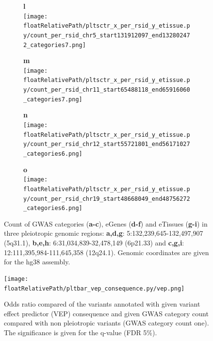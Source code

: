 \begin{figure}[!tbp]
%
\begin{subfigure}[]{.19\textwidth}
\textbf{l}
\\
\texttt{[image: \\floatRelativePath/pltsctr\_x\_per\_rsid\_y\_etissue.py/count\_per\_rsid\_chr5\_start131912097\_end132802472\_categories7.png]}
\end{subfigure}
%
\begin{subfigure}[]{.19\textwidth}
\textbf{m}
\\
\texttt{[image: \\floatRelativePath/pltsctr\_x\_per\_rsid\_y\_etissue.py/count\_per\_rsid\_chr11\_start65488118\_end65916060\_categories7.png]}
\end{subfigure}
%
\begin{subfigure}[]{.19\textwidth}
\textbf{n}
\\
\texttt{[image: \\floatRelativePath/pltsctr\_x\_per\_rsid\_y\_etissue.py/count\_per\_rsid\_chr12\_start55721801\_end56171027\_categories6.png]}
\end{subfigure}
%
\begin{subfigure}[]{.19\textwidth}
\textbf{o}
\\
\texttt{[image: \\floatRelativePath/pltsctr\_x\_per\_rsid\_y\_etissue.py/count\_per\_rsid\_chr19\_start48668049\_end48756272\_categories6.png]}
\end{subfigure}

\caption{Count of GWAS categories (\textbf{a-c}), eGenes (\textbf{d-f}) and eTissues (\textbf{g-i}) in three pleiotropic genomic regions: \textbf{a,d,g}: 5:132,239,645-132,497,907 (5q31.1), \textbf{b,e,h}: 6:31,034,839-32,478,149 (6p21.33) and \textbf{c,g,i}: 12:111,395,984-111,645,358 (12q24.1). Genomic coordinates are given for the hg38 assembly.} \label{fig:region_gwas_egenes_tissues}
%
\end{figure}
%
%
\begin{figure}[!tbp]
\centering
%
\texttt{[image: \\floatRelativePath/pltbar\_vep\_consequence.py/vep.png]}
%
\caption{Odds ratio compared of the variants annotated with given variant effect predictor (VEP) consequence and given GWAS category count compared with non pleiotropic variants (GWAS category count one). The significance is given for the q-value (FDR 5\%).}
%
\end{figure}
